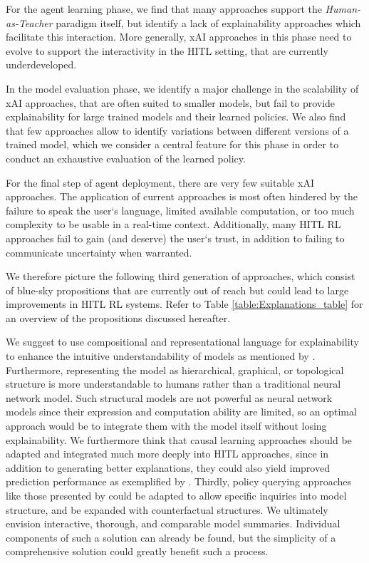\documentclass[twoside,11pt]{article}
\begin{document}
\begin{enumerate}
For the agent learning phase, we find that many approaches support the \emph{Human-as-Teacher} paradigm itself, but identify a lack of explainability approaches which facilitate this interaction. More generally, xAI approaches in this phase need to evolve to support the interactivity in the HITL setting, that are currently underdeveloped.

In the model evaluation phase, we identify a major challenge in the scalability of xAI approaches, that are often suited to smaller models, but fail to provide explainability for large trained models and their learned policies. We also find that few approaches allow to identify variations between different versions of a trained model, which we consider a central feature for this phase in order to conduct an exhaustive evaluation of the learned policy.

For the final step of agent deployment, there are very few suitable xAI approaches. The application of current approaches is most often hindered by the failure to speak the user`s language, limited available computation, or too much complexity to be usable in a real-time context. Additionally, many HITL RL approaches fail to gain (and deserve) the user`s trust, in addition to failing to communicate uncertainty when warranted.

We therefore picture the following third generation of approaches, which consist of blue-sky propositions that are currently out of reach but could lead to large improvements in HITL RL systems. Refer to Table \ref{table:Explanations_table} for an overview of the propositions discussed hereafter.


We suggest to use compositional and representational language for explainability to enhance the intuitive understandability of models as mentioned by \citet{RoyEtAl:2021:RLRoboticsChallenges}.
Furthermore, representing the model as hierarchical, graphical, or topological structure \citep{lyu2019sdrl,battaglia2018relational} is more understandable to humans rather than a traditional neural network model. Such structural models are not powerful as neural network models since their expression and computation ability are limited, so an optimal approach would be to integrate them with the model itself without losing explainability.
We furthermore think that causal learning approaches should be adapted and integrated much more deeply into HITL approaches, since in addition to generating better explanations, they could also yield improved prediction performance as exemplified by \citet{MadumalEtAl:2020:CausalRLCFs}. Thirdly, policy querying approaches like those presented by \citet{HayesShah:2017:AutonomousPolicyExplanation} could be adapted to allow specific inquiries into model structure, and be expanded with counterfactual structures.
We ultimately envision interactive, thorough, and comparable model summaries. Individual components of such a solution can already be found, but the simplicity of a comprehensive solution could greatly benefit such a process.



\end{enumerate}
\end{document}
